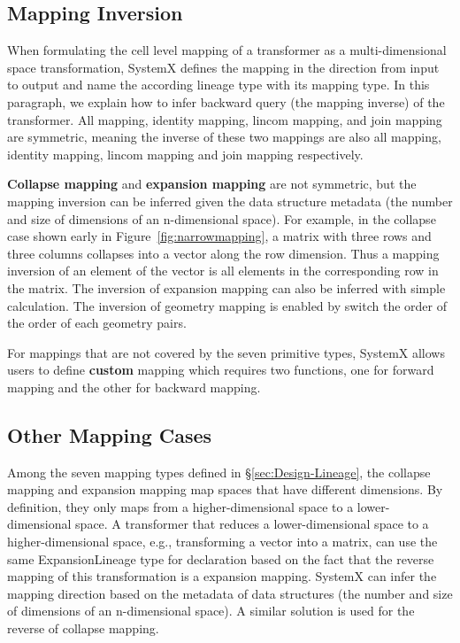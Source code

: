 \documentclass{sig-alternate}
\begin{document}
\subsection{Mapping Inversion}
When formulating the cell level mapping of a transformer as a multi-dimensional space transformation, SystemX defines
the mapping in the direction from input to output and name the according lineage type with its mapping type.
In this paragraph, we explain how to infer backward query (the mapping inverse) of the transformer.
All mapping, identity mapping, lincom mapping, and join mapping are symmetric, 
meaning the inverse of these two mappings are also all mapping, identity mapping, 
lincom mapping and join mapping respectively.

{\bf Collapse mapping} and {\bf expansion mapping} are not symmetric, but the mapping inversion can be inferred
given the data structure metadata (the number and size of dimensions of an n-dimensional space). For example, 
in the collapse case shown early in Figure~\ref{fig:narrowmapping}, a matrix with three rows and three columns
collapses into a vector along the row dimension. Thus a mapping inversion of an element of the vector
is all elements in the corresponding row in the matrix. 
The inversion of expansion mapping can also be inferred with simple calculation.
The inversion of geometry mapping is enabled by switch the order of the order of each geometry pairs.

For mappings that are not covered by the seven primitive types, SystemX allows users to define {\bf custom} mapping
which requires two functions, one for forward mapping and the other for backward mapping.

\subsection{Other Mapping Cases}
Among the seven mapping types defined in \S\ref{sec:Design-Lineage}, the collapse mapping and expansion mapping
map spaces that have different dimensions. By definition, they only maps from a higher-dimensional space to a lower-dimensional space.
A transformer that reduces a lower-dimensional space to a higher-dimensional space, e.g., transforming a vector into a matrix, can use
the same ExpansionLineage type for declaration based on the fact that the reverse mapping of this transformation is a
expansion mapping. SystemX can infer the mapping direction based on the metadata of data structures 
(the number and size of dimensions of an n-dimensional space). 
A similar solution is used for the reverse of collapse mapping.
\end{document}

